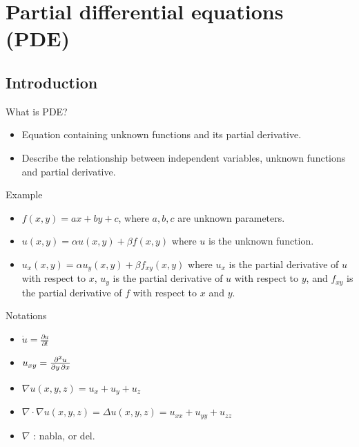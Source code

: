 \documentclass[aspectratio=1610,xcolor={dvipsnames},hyperref={colorlinks,unicode,linkcolor=violet,anchorcolor=BlueViolet,citecolor=YellowOrange,filecolor=black,urlcolor=Aquamarine}]{beamer}
\begin{document}
\section{Partial differential equations (PDE)}
\label{sec:org16c5aaf}

\subsection{Introduction}
\label{sec:orgfe3f5d8}

\begin{frame}[label={sec:org4d67a19}]{What is PDE?}
\begin{itemize}
\item Equation containing \alert{unknown functions} and \alert{its partial derivative}.
\item Describe the relationship between independent variables, unknown functions and partial derivative.
\end{itemize}

\begin{exampleblock}{Example}\label{sec:orga121ad7}
\begin{itemize}
\item \(f(x, y) = ax + by + c\), where \(a, b, c\) are unknown parameters.
\item \(u(x, y) = \alpha u(x, y) + \beta f(x, y)\) where \(u\) is the unknown function.
\item \(u_{x}(x, y) = \alpha u_{y}(x, y) + \beta f_{xy}(x, y)\) where \(u_{x}\) is the partial derivative of \(u\) with respect to \(x\), \(u_{y}\) is the partial derivative of \(u\) with respect to \(y\), and \(f_{xy}\) is the partial derivative of \(f\) with respect to \(x\) and \(y\).
\end{itemize}
\end{exampleblock}
\end{frame}

\begin{frame}[label={sec:org01d28c4}]{Notations}
\begin{itemize}
\item \(\dot{u} = \frac{\partial{u}}{\partial{t}}\)
\item \(u_{xy} = {\partial ^{2}u \over \partial y\,\partial x}\)
\item \(\nabla u (x, y, z) = u_{x} + u_{y} + u_{z}\)
\item \(\nabla \cdot \nabla u(x, y, z) = \Delta u(x,y,z) = u_{xx} + u_{yy} + u_{zz}\)
\item \(\nabla\) : nabla, or del.
\end{itemize}
\end{frame}
\end{document}
